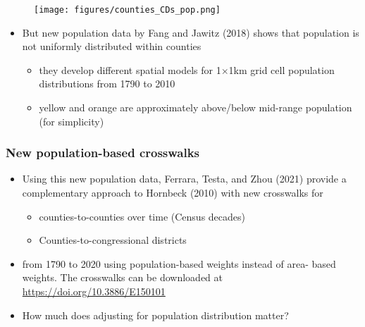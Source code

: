 \documentclass{beamer}
\begin{document}

\begin{frame}
\begin{figure}
    \centering
    \texttt{[image: figures/counties\_CDs\_pop.png]}
\end{figure}
\begin{itemize}
    \item But new population data by Fang and Jawitz (2018) shows that population is not uniformly distributed within counties
    \begin{itemize}
        \item they develop different spatial models for 1$\times$1km grid cell population distributions from 1790 to 2010
        \item yellow and orange are approximately above/below mid-range population (for simplicity)
    \end{itemize}
\end{itemize}

\end{frame}


\begin{frame}
\frametitle{New population-based crosswalks}
\begin{itemize}
    \item Using this new population data, Ferrara, Testa, and Zhou (2021) provide a complementary approach to Hornbeck (2010) with new crosswalks for
    \begin{itemize}
        \item counties-to-counties over time (Census decades)
        \item Counties-to-congressional districts
    \end{itemize}
    \item from 1790 to 2020 using population-based weights instead of area-   
   based weights. The crosswalks can be downloaded at \\ \color{blue}\url{https://doi.org/10.3886/E150101}\color{black}
\end{itemize}
\bigskip
\begin{itemize}
    \item How much does adjusting for population distribution matter?
\end{itemize}

\end{frame}
\end{document}
